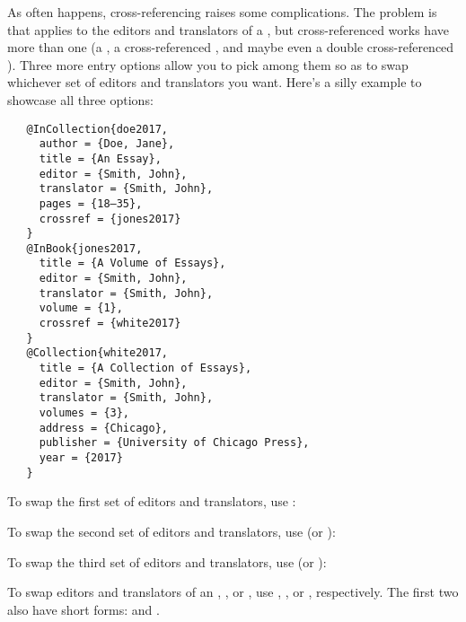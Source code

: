 \documentclass[11pt,letterpaper,oneside]{article}
\begin{document}
As often happens, cross-referencing raises some complications. The
problem is that  applies to the editors and translators
of a , but cross-referenced works have more than one
(a , a cross-referenced , and maybe
even a double cross-referenced ). Three more entry
options allow you to pick among them so as to swap whichever set of
editors and translators you want. Here's a silly example to showcase
all three options:

\begin{verbatim}
   @InCollection{doe2017,
     author = {Doe, Jane},
     title = {An Essay},
     editor = {Smith, John},
     translator = {Smith, John},
     pages = {18–35},
     crossref = {jones2017}
   }
   @InBook{jones2017,
     title = {A Volume of Essays},
     editor = {Smith, John},
     translator = {Smith, John},
     volume = {1},
     crossref = {white2017}
   }
   @Collection{white2017,
     title = {A Collection of Essays},
     editor = {Smith, John},
     translator = {Smith, John},
     volumes = {3},
     address = {Chicago},
     publisher = {University of Chicago Press},
     year = {2017}
   }
\end{verbatim}

To swap the first set of editors and translators, use
:

\begin{citebib}
\item \cite{doe2017a}
\end{citebib}

To swap the second set of editors and translators, use
 (or ):

\begin{citebib}
\item \cite{doe2017b}
\end{citebib}

To swap the third set of editors and translators, use
 (or ):

\begin{citebib}
\item \cite{doe2017c}
\end{citebib}

To swap editors and translators of an ,
, or , use
, , or
, respectively. The first two also have short
forms:  and .
\end{document}
